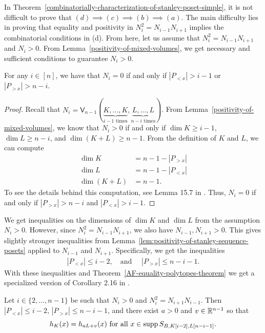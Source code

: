 \documentclass{puthesis-UG}
\begin{document}
In Theorem~\ref{combinatorially-characterization-of-stanley-poset-simple}, it is not difficult to prove that $(d)\implies(c)\implies(b)\implies(a)$. The main difficulty lies in proving that equality and positivity in $N_i^2 = N_{i-1} N_{i+1}$ implies the combinatorial conditions in (d). From here, let us assume that $N_i^2 = N_{i-1} N_{i+1}$ and $N_i > 0$. From Lemma~\ref{positivity-of-mixed-volumes}, we get necessary and sufficient conditions to guarantee $N_i > 0$. 

\begin{lem}  \label{lem:positivity-of-stanley-sequence-posets}
	For any $i \in [n]$, we have that $N_i = 0$ if and only if $|P_{< x}| > i-1$ or $|P_{> x}| > n-i$. 
\end{lem}

\begin{proof}
	Recall that $N_i = \mathsf{V}_{n-1} (\underbrace{K, \ldots, K}_{i-1 \text{ times}}, \underbrace{L, \ldots, L}_{n-i \text{ times}})$. From Lemma~\ref{positivity-of-mixed-volumes}, we know that $N_i > 0$ if and only if $\dim K \geq i-1$, $\dim L \geq n-i$, and $\dim (K+L) \geq n-1$. From the definition of $K$ and $L$, we can compute
	\begin{align*}
		\dim K & = n-1-|P_{> x}| \\
		\dim L & = n-1 - |P_{< x}| \\
		\dim (K+L) & = n-1. 
	\end{align*} 
	To see the details behind this computation, see Lemma 15.7 in \cite{shenfeld2022extremals}. Thus, $N_i = 0$ if and only if $|P_{> x}| > n-i$ and $|P_{<x}| > i-1$. 
\end{proof}

We get inequalities on the dimensions of $\dim K$ and $\dim L$ from the assumption $N_i > 0$. However, since $N_i^2 = N_{i-1}N_{i+1}$, we also have $N_{i-1}, N_{i+1} > 0$. This gives slightly stronger inequalities from Lemma~\ref{lem:positivity-of-stanley-sequence-posets} applied to $N_{i-1}$ and $N_{i+1}$. Specifically, we get the inequalities
\begin{align*}
	|P_{< x}| \leq i-2, \quad \text{and } \quad |P_{>x}| \leq n-i-1. 
\end{align*}
With these inequalities and Theorem~\ref{AF-equality-polytopes-theorem} we get a specialized version of Corollary 2.16 in \cite{shenfeld2022extremals}.

\begin{lem}  \label{stanley-lemma-to-extract-combinatorial-information}
	Let $i \in \{2, \ldots, n-1\}$ be such that $N_i > 0$ and $N_i^2 = N_{i+1} N_{i-1}$. Then $|P_{<x}| \leq i-2$, $|P_{>x}| \leq n-i-1$, and there exist $a > 0$ and $v \in \mathbb{R}^{n-1}$ so that 
	\[
		h_K(x) = h_{aL + v}(x) \text{ for all } x \in \operatorname{supp} S_{B, K[i-2], L[n-i-1]}.
	\]

\end{lem}
\end{document}
